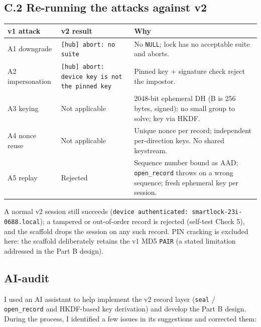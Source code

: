 \documentclass[11pt,a4paper]{article}
\begin{document}
\subsection{C.2 Re-running the attacks against v2}
\begin{center}
\renewcommand{\arraystretch}{1.25}
\begin{tabular}{@{}p{2.6cm}p{6.0cm}p{5.2cm}@{}}
\toprule
\textbf{v1 attack} & \textbf{v2 result} & \textbf{Why}\\
\midrule
A1 downgrade & \texttt{[hub] abort: no suite} & No \texttt{NULL}; lock has no
acceptable suite and aborts.\\
A2 impersonation & \texttt{[hub] abort: device key is not the pinned key} & Pinned
key + signature check reject the impostor.\\
A3 keying & Not applicable & 2048-bit ephemeral DH (B is 256 bytes, signed); no small
group to solve; key via HKDF.\\
A4 nonce reuse & Not applicable & Unique nonce per record; independent per-direction
keys. No shared keystream.\\
A5 replay & Rejected & Sequence number bound as AAD; \texttt{open\_record} throws on
a wrong sequence; fresh ephemeral key per session.\\
\bottomrule
\end{tabular}
\end{center}
A normal v2 session still succeeds (\texttt{device authenticated:
smartlock-23i-0688.local}); a tampered or out-of-order record is rejected
(self-test Check 5), and the scaffold drops the session on any such record. PIN
cracking is excluded here: the scaffold deliberately retains the v1 MD5 \texttt{PAIR}
(a stated limitation addressed in the Part B design).

\subsection{AI-audit}
I used an AI assistant to help implement the v2 record layer (\texttt{seal} /
\texttt{open\_record} and HKDF-based key derivation) and develop the Part B design.
During the process, I identified a few issues in its suggestions and corrected them:
\end{document}
